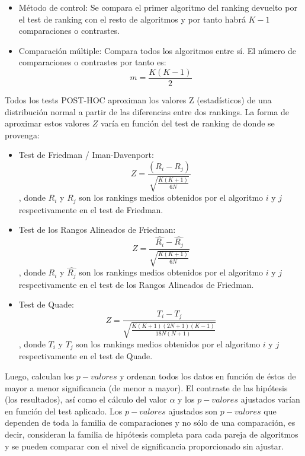 \begin{itemize}
\item Método de control: Se compara el primer algoritmo del ranking devuelto por el test de ranking con el resto
de algoritmos y por tanto habrá $K-1$ comparaciones o contrastes.
\item Comparación múltiple: Compara todos los algoritmos entre sí. El número de comparaciones o contrastes por
tanto es:
\[ m = \frac{K(K-1)}{2} \]
\end{itemize}

Todos los tests POST-HOC aproximan los valores Z (estadísticos) de una distribución normal a partir de las
diferencias entre dos rankings. La forma de aproximar estos valores $Z$ varía en función del test de ranking de
donde se provenga:

\begin{itemize}
\item Test de Friedman / Iman-Davenport:
\[ Z = \frac{(R_i - R_j)}{\sqrt{\frac{K(K+1)}{6N}}} \]
, donde $R_i$ y $R_j$ son los rankings medios obtenidos por el algoritmo $i$ y $j$ respectivamente en el test
de Friedman.
\item Test de los Rangos Alineados de Friedman:
\[ Z = \frac{\hat{R_{i}} - \hat{R_{j}}}{\sqrt{\frac{K(K+1)}{6N}}} \]
, donde $\hat{R_{i}}$ y $\hat{R_{j}}$ son los rankings medios obtenidos por el algoritmo $i$ y $j$ respectivamente en el test
de los Rangos Alineados de Friedman.
\item Test de Quade:
\[ Z = \frac {T_i - T_j}{\sqrt{\frac{K(K+1)(2N+1)(K-1)}{18N(N+1)}}} \]
, donde $T_i$ y $T_j$ son los rankings medios obtenidos por el algoritmo $i$ y $j$ respectivamente en el test
de Quade.
\end{itemize}

Luego, calculan los $p-valores$ y ordenan todos los datos en función de éstos de mayor a menor significancia (de
menor a mayor). El contraste de las hipótesis (los resultados), así como el cálculo del valor $\alpha$ y los
$p-valores$ ajustados varían en función del test aplicado. Los $p-valores$ ajustados son $p-valores$ que dependen
de toda la familia de comparaciones y no sólo de una comparación, es decir, consideran la familia de hipótesis
completa para cada pareja de algoritmos y se pueden comparar con el nivel de significancia proporcionado sin
ajustar.

